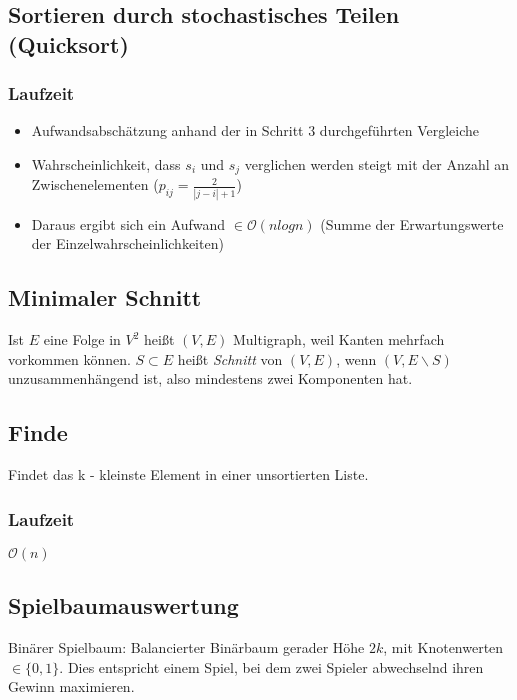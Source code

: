 \subsection{Sortieren durch stochastisches Teilen (Quicksort)}


\subsubsection{Laufzeit}
\begin{itemize}
	\item Aufwandsabschätzung anhand der in Schritt 3 durchgeführten Vergleiche
	\item Wahrscheinlichkeit, dass \(s_i\) und \(s_j\) verglichen werden steigt mit der Anzahl an Zwischenelementen (\(p_{ij}=\frac{2}{|j-i|+1}\))
	\item Daraus ergibt sich ein Aufwand \(\in \mathcal{O}(nlogn)\) (Summe der Erwartungswerte der Einzelwahrscheinlichkeiten)
\end{itemize}


\subsection{Minimaler Schnitt}
Ist \(E\) eine Folge in \(V^2\) heißt \((V,E)\) Multigraph, weil Kanten mehrfach vorkommen können. \(S \subset E\) heißt \textit{Schnitt} von \((V,E)\), wenn \((V, E \backslash S)\) unzusammenhängend ist, also mindestens zwei Komponenten hat.



\subsection{Finde}
Findet das k - kleinste Element in einer unsortierten Liste.\\


\subsubsection{Laufzeit}
\(\mathcal{O}(n)\)

\subsection{Spielbaumauswertung}
Binärer Spielbaum: Balancierter Binärbaum gerader Höhe \(2k\), mit Knotenwerten \(\in \{0,1\}\). Dies entspricht einem Spiel, bei dem zwei Spieler abwechselnd ihren Gewinn maximieren.

